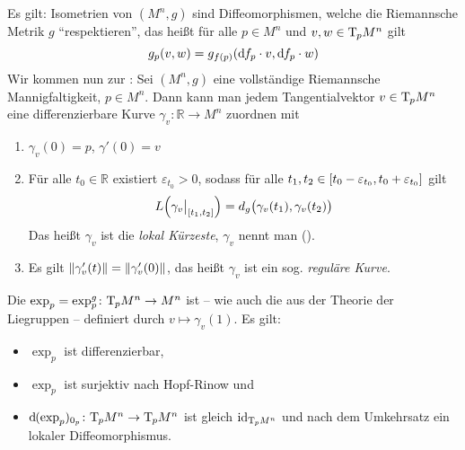 Es gilt: Isometrien von $(M^n,g)$ sind Diffeomorphismen, welche die Riemannsche Metrik $g$ \enquote{respektieren}, das heißt für alle $p \in M^n$ und $v,w \in \Tmap_p M^n$ gilt
\[
	g_p(v,w) = g_{f(p)} \enbrace*{\mathd f_p \cdot v , \mathd f_p \cdot w}
\]
Wir kommen nun zur : 
Sei $(M^n,g)$ eine vollständige Riemannsche Mannigfaltigkeit, $p \in M^n$.
Dann kann man jedem Tangentialvektor $v \in \Tmap_p M^n$ eine differenzierbare Kurve $\gamma_v \colon \mathbb{R} \to M^n$ zuordnen mit
\begin{enumerate}[1),itemsep=1pt]
	\item $\gamma_v(0)=p$, $\gamma'(0)=v$
	\item Für alle $t_0 \in \mathbb{R}$ existiert $\varepsilon_{t_0} >0$, sodass für alle $t_1,t_2 \in \benbrace*{t_0 - \varepsilon_{t_0}, t_0 + \varepsilon_{t_0}}$ gilt
	\[
		L \enbrace*{\gamma_v\big|_{\benbrace*{t_1,t_2}}} = d_g \enbrace[\big]{\gamma_v(t_1), \gamma_v(t_2)}
	\]
	Das heißt $\gamma_v$ ist die \emph{lokal Kürzeste}, $\gamma_v$ nennt man ().
	\item Es gilt $\norm*{\gamma_v'(t)} = \norm*{\gamma_v'(0)}$, das heißt $\gamma_v$ ist ein sog. \emph{reguläre Kurve}.
\end{enumerate}
Die  $\exp_p = \exp_p^g \colon \Tmap_p M^n \to M^n$ ist -- wie auch die aus der Theorie der Liegruppen -- definiert durch $v \mapsto \gamma_v(1)$.
Es gilt:
\begin{itemize}[itemsep=1pt]
	\item $\exp_p$ ist differenzierbar,
	\item $\exp_p$ ist surjektiv nach Hopf-Rinow und
	\item $\mathd(\exp_p)_{0_p} \colon \Tmap_p M^n \to \Tmap_p M^n$ ist gleich $\id_{\Tmap_p M^n}$ und nach dem Umkehrsatz ein lokaler Diffeomorphismus.
\end{itemize} 

